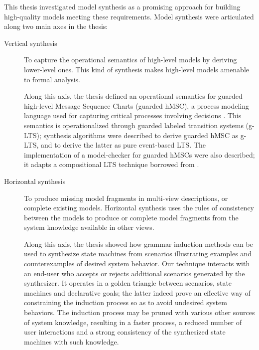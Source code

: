 This thesis investigated model synthesis as a promising approach for building high-quality models meeting these requirements. Model synthesis were articulated along two main axes in the thesis:
\begin{description}
\item[Vertical synthesis] To capture the operational semantics of high-level models by deriving lower-level ones. This kind of synthesis makes high-level models amenable to formal analysis.

Along this axis, the thesis defined an operational semantics for guarded high-level Message Sequence Charts (guarded hMSC), a process modeling language used for capturing critical processes involving decisions \cite{Damas:2011}. This semantics is operationalized through guarded labeled transition systems (g-LTS); synthesis algorithms were described to derive guarded hMSC as g-LTS, and to derive the latter as pure event-based LTS. The implementation of a model-checker for guarded hMSCs were also described; it adapts a compositional LTS technique borrowed from \cite{Giannakopoulou:2003}.

\item[Horizontal synthesis] To produce missing model fragments in multi-view descriptions, or complete existing models. Horizontal synthesis uses the rules of consistency between the models to produce or complete model fragments from the system knowledge available in other views.

Along this axis, the thesis showed how grammar induction methods can be used to synthesize state machines from scenarios illustrating examples and counterexamples of desired system behavior. Our technique interacts with an end-user who accepts or rejects additional scenarios generated by the synthesizer. It operates in a golden triangle between scenarios, state machines and declarative goals; the latter indeed prove an effective way of constraining the induction process so as to avoid undesired system behaviors. The induction process may be pruned with various other sources of system knowledge, resulting in a faster process, a reduced number of user interactions and a strong consistency of the synthesized state machines with such knowledge.
\end{description}


